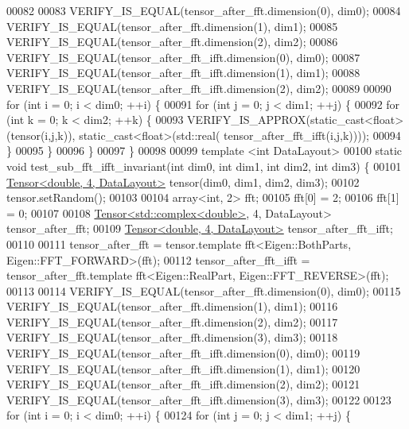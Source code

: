 \begin{DoxyCode}
00082 
00083   VERIFY\_IS\_EQUAL(tensor\_after\_fft.dimension(0), dim0);
00084   VERIFY\_IS\_EQUAL(tensor\_after\_fft.dimension(1), dim1);
00085   VERIFY\_IS\_EQUAL(tensor\_after\_fft.dimension(2), dim2);
00086   VERIFY\_IS\_EQUAL(tensor\_after\_fft\_ifft.dimension(0), dim0);
00087   VERIFY\_IS\_EQUAL(tensor\_after\_fft\_ifft.dimension(1), dim1);
00088   VERIFY\_IS\_EQUAL(tensor\_after\_fft\_ifft.dimension(2), dim2);
00089 
00090   \textcolor{keywordflow}{for} (\textcolor{keywordtype}{int} i = 0; i < dim0; ++i) \{
00091     \textcolor{keywordflow}{for} (\textcolor{keywordtype}{int} j = 0; j < dim1; ++j) \{
00092       \textcolor{keywordflow}{for} (\textcolor{keywordtype}{int} k = 0; k < dim2; ++k) \{
00093         VERIFY\_IS\_APPROX(static\_cast<float>(tensor(i,j,k)), static\_cast<float>(std::real(
      tensor\_after\_fft\_ifft(i,j,k))));
00094       \}
00095     \}
00096   \}
00097 \}
00098 
00099 \textcolor{keyword}{template} <\textcolor{keywordtype}{int} DataLayout>
00100 \textcolor{keyword}{static} \textcolor{keywordtype}{void} test\_sub\_fft\_ifft\_invariant(\textcolor{keywordtype}{int} dim0, \textcolor{keywordtype}{int} dim1, \textcolor{keywordtype}{int} dim2, \textcolor{keywordtype}{int} dim3) \{
00101   \hyperlink{class_eigen_1_1_tensor}{Tensor<double, 4, DataLayout>} tensor(dim0, dim1, dim2, dim3);
00102   tensor.setRandom();
00103 
00104   array<int, 2> fft;
00105   fft[0] = 2;
00106   fft[1] = 0;
00107 
00108   \hyperlink{class_eigen_1_1_tensor}{Tensor<std::complex<double>}, 4, DataLayout> tensor\_after\_fft;
00109   \hyperlink{class_eigen_1_1_tensor}{Tensor<double, 4, DataLayout>} tensor\_after\_fft\_ifft;
00110 
00111   tensor\_after\_fft = tensor.template fft<Eigen::BothParts, Eigen::FFT\_FORWARD>(fft);
00112   tensor\_after\_fft\_ifft = tensor\_after\_fft.template fft<Eigen::RealPart, Eigen::FFT\_REVERSE>(fft);
00113 
00114   VERIFY\_IS\_EQUAL(tensor\_after\_fft.dimension(0), dim0);
00115   VERIFY\_IS\_EQUAL(tensor\_after\_fft.dimension(1), dim1);
00116   VERIFY\_IS\_EQUAL(tensor\_after\_fft.dimension(2), dim2);
00117   VERIFY\_IS\_EQUAL(tensor\_after\_fft.dimension(3), dim3);
00118   VERIFY\_IS\_EQUAL(tensor\_after\_fft\_ifft.dimension(0), dim0);
00119   VERIFY\_IS\_EQUAL(tensor\_after\_fft\_ifft.dimension(1), dim1);
00120   VERIFY\_IS\_EQUAL(tensor\_after\_fft\_ifft.dimension(2), dim2);
00121   VERIFY\_IS\_EQUAL(tensor\_after\_fft\_ifft.dimension(3), dim3);
00122 
00123   \textcolor{keywordflow}{for} (\textcolor{keywordtype}{int} i = 0; i < dim0; ++i) \{
00124     \textcolor{keywordflow}{for} (\textcolor{keywordtype}{int} j = 0; j < dim1; ++j) \{

\end{DoxyCode}
